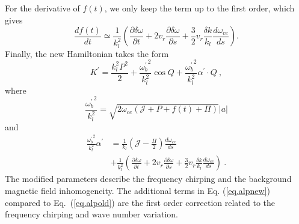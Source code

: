 For the derivative of $f(t)$, we only keep the term up to the first order, which gives
\begin{equation}
    \frac{d f(t)}{d t} \simeq \frac{1}{k_l^2}(\frac{\partial \delta \omega}{\partial t} + 2 v_r \frac{\partial \delta \omega}{\partial s} + \frac{3}{2}v_r\frac{\delta k}{k_l} \frac{d \omega_{ce}}{d s}  ).
\end{equation}
Finally, the new Hamiltonian takes the  form 
\begin{equation}\label{eq.H_frame}
    K^\prime = \frac{k_l^2 P^2}{2} + \frac{{\omega^\prime_{b}}^2}{k_l^2} \cos Q +\frac{{\omega^\prime_{b}}^2}{k_l^2} \alpha^\prime \cdot Q~,
\end{equation}
where 
\begin{equation}
    \frac{{\omega^\prime_{b}}^2}{k_l^2} = \sqrt{2\omega_{ce}(\mathcal{J}+P+f(t)+\Pi)}  |a|
\end{equation}
and 
\begin{equation}\label{eq.alpnew}
    \begin{aligned}
    \frac{{\omega^\prime_{b}}^2}{k_l^2}\alpha^\prime & = \frac{1}{k_l}\left(\mathcal{J} - \frac{\Pi}{2}\right) \frac{d\omega_{ce}}{ds} \\
    & + \frac{1}{k_l^2}\left(\frac{\partial \delta \omega}{\partial t} + 2 v_r \frac{\partial \delta \omega}{\partial s} + \frac{3}{2}v_r\frac{\delta k}{k_l} \frac{d \omega_{ce}}{d s}\right)~.
    \end{aligned}
\end{equation}
The modified parameters describe the frequency chirping and 
the background magnetic field inhomogeneity.
The additional terms in Eq. (\ref{eq.alpnew}) compared to Eq.~(\ref{eq.alpold}) are the first order correction related to the frequency chirping and wave number variation.


